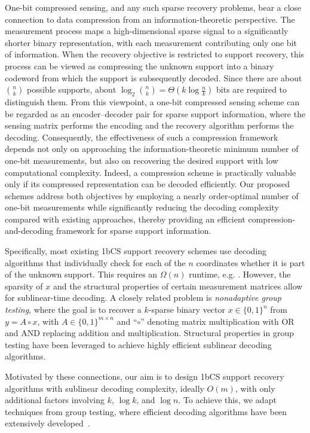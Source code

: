 \documentclass{article}
\begin{document}
One-bit compressed sensing, and any such sparse recovery problems, bear a close connection to data compression from an information-theoretic perspective. The measurement process maps a high-dimensional sparse signal to a significantly shorter binary representation, with each measurement contributing only one bit of information. When the recovery objective is restricted to support recovery, this process can be viewed as compressing the unknown support into a binary codeword from which the support is subsequently decoded. Since there are about $\binom{n}{k}$ possible supports, about
$
\log_2 \binom{n}{k}
=
\Theta\!\left(k\log\frac{n}{k}\right)
$
bits are required to distinguish them. From this viewpoint, a one-bit compressed sensing scheme can be regarded as an encoder--decoder pair for sparse support information, where the sensing matrix performs the encoding and the recovery algorithm performs the decoding. Consequently, the effectiveness of such a compression framework depends not only on approaching the information-theoretic minimum number of one-bit measurements, but also on recovering the desired support with low computational complexity. Indeed, a compression scheme is practically valuable only if its compressed representation can be decoded efficiently. Our proposed schemes address both objectives by employing a nearly order-optimal number of one-bit measurements while significantly reducing the decoding complexity compared with existing approaches, thereby providing an efficient compression-and-decoding framework for sparse support information.

Specifically, most existing 1bCS support recovery schemes use decoding algorithms that individually check for each of the $n$ coordinates whether it is part of the unknown support. 
This requires an $\Omega(n)$ runtime, e.g. \cite{gopi2013one,acharya2017improved,matsumoto2023improved}. However, the sparsity of $x$ and the structural properties of certain measurement matrices allow for sublinear-time decoding. A closely related problem is {\em nonadaptive group testing}, where the goal is to recover a $k$-sparse binary vector $x \in \{0,1\}^n$ from $y = A \circ x$, with $A \in \{0,1\}^{m \times n}$ and ``$\circ$'' denoting matrix multiplication with OR and AND replacing addition and multiplication. Structural properties in group testing have been leveraged to achieve highly efficient sublinear decoding algorithms.

Motivated by these connections, our aim is to design 1bCS support recovery algorithms with sublinear decoding complexity, ideally $O(m)$, with only additional factors involving $k$, $\log k$, and $\log n$. To achieve this, we adapt techniques from group testing, where efficient decoding algorithms have been extensively developed~\cite{lee2019saffron,cheraghchi2020combinatorial,cai2017efficient,guruswami2023noise}.
\end{document}
